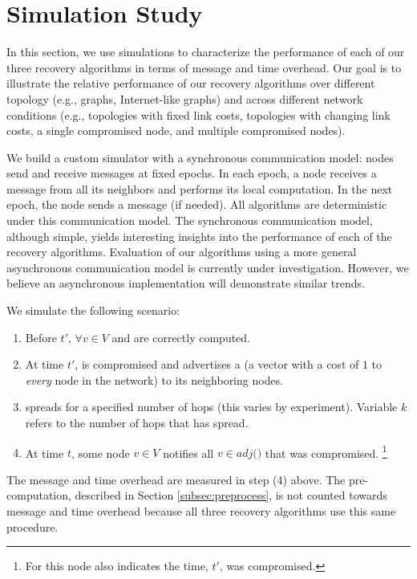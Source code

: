 \section{Simulation Study}
\label{sec:eval}

In this section, we use simulations to characterize the performance of each of our three recovery algorithms in terms of message and time overhead. 
Our goal is to illustrate the relative performance of our recovery algorithms over different topology (e.g., \er graphs, Internet-like graphs) and across
different network conditions (e.g., topologies with fixed link costs, topologies with changing link costs, a single compromised node, and multiple compromised nodes).

We build a custom simulator with a synchronous communication model: nodes send and receive messages at fixed epochs.  In each epoch, a node receives a
message from all its neighbors and performs its local computation.  In
the next epoch, the node sends a message (if needed).   All algorithms
are deterministic under this communication model.
The synchronous communication model, although simple, yields
interesting insights into the performance of each of the recovery
algorithms. Evaluation of our algorithms using a more general
asynchronous communication model is currently under
investigation. However, we believe an asynchronous implementation
will demonstrate similar trends.  

We simulate the following scenario:

\begin{enumerate}
	\item Before $t'$, $\forall v \in V$ \minvv and \dmatrixv are correctly computed.

	\item At time $t'$, \bad is compromised and advertises a \badvector (a vector with a cost of $1$ to \emph{every} node in the network) to its neighboring nodes.

	\item \badvector spreads for a specified number of hops (this varies by experiment).  Variable $k$ refers to the number of hops that \badvector has spread.

	\item At time $t$, some node $v \in V$ notifies all $v \in adj($\bads$)$ that \bad was compromised. 
	{\footnote { \small For \cpr this node also indicates the time, $t'$, \bad was compromised.}} 

\end{enumerate}
The message and time overhead are measured in step (4) above. The pre-computation, described in Section \ref{subsec:preprocess}, is not counted towards message and time overhead
because all three recovery algorithms use this same procedure.

